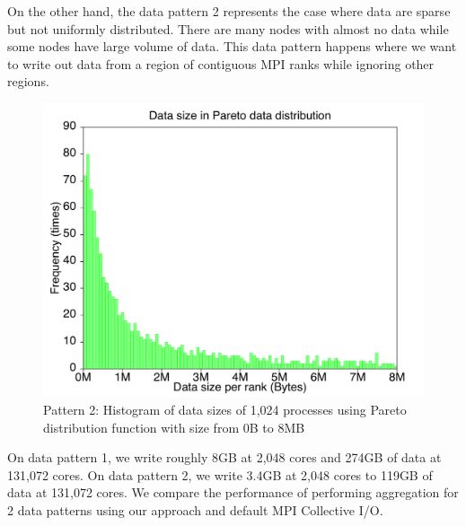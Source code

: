 On the other hand, the data pattern 2 represents the case where data are sparse but not uniformly distributed. There are many nodes with almost no data while some nodes have large volume of data. This data pattern happens where we want to write out data from a region of contiguous MPI ranks while ignoring other regions.

\begin{figure}[!htb]
\vspace{-0.1in}
\centering
\includegraphics[scale=0.3]{figures/pareto.pdf}
\vspace{-0.1in}
\caption{Pattern 2: Histogram of data sizes of 1,024 processes using Pareto distribution function with size from 0B to 8MB}
\label{fig:pareto}
\vspace{-0.1in}
\end{figure}

On data pattern 1, we write roughly 8GB at 2,048 cores and 274GB of data at 131,072 cores. On data pattern 2, we write 3.4GB at 2,048 cores to 119GB of data at 131,072 cores. We compare the performance of performing aggregation for 2 data patterns using our approach and default MPI Collective I/O.

